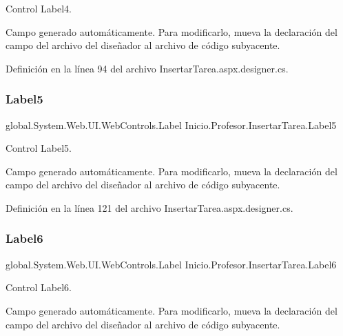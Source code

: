 Control Label4. 

Campo generado automáticamente. Para modificarlo, mueva la declaración del campo del archivo del diseñador al archivo de código subyacente. 

Definición en la línea 94 del archivo Insertar\+Tarea.\+aspx.\+designer.\+cs.

\mbox{\label{classInicio_1_1Profesor_1_1InsertarTarea_af5b66456b170efa53193afd4c2694e53}} 
\subsubsection{\texorpdfstring{Label5}{Label5}}
{\footnotesize\ttfamily global.\+System.\+Web.\+U\+I.\+Web\+Controls.\+Label Inicio.\+Profesor.\+Insertar\+Tarea.\+Label5\hspace{0.3cm}{\ttfamily [protected]}}



Control Label5. 

Campo generado automáticamente. Para modificarlo, mueva la declaración del campo del archivo del diseñador al archivo de código subyacente. 

Definición en la línea 121 del archivo Insertar\+Tarea.\+aspx.\+designer.\+cs.

\mbox{\label{classInicio_1_1Profesor_1_1InsertarTarea_abb5f51dcdce0e6c834e27f2efdaa635e}} 
\subsubsection{\texorpdfstring{Label6}{Label6}}
{\footnotesize\ttfamily global.\+System.\+Web.\+U\+I.\+Web\+Controls.\+Label Inicio.\+Profesor.\+Insertar\+Tarea.\+Label6\hspace{0.3cm}{\ttfamily [protected]}}



Control Label6. 

Campo generado automáticamente. Para modificarlo, mueva la declaración del campo del archivo del diseñador al archivo de código subyacente. 

